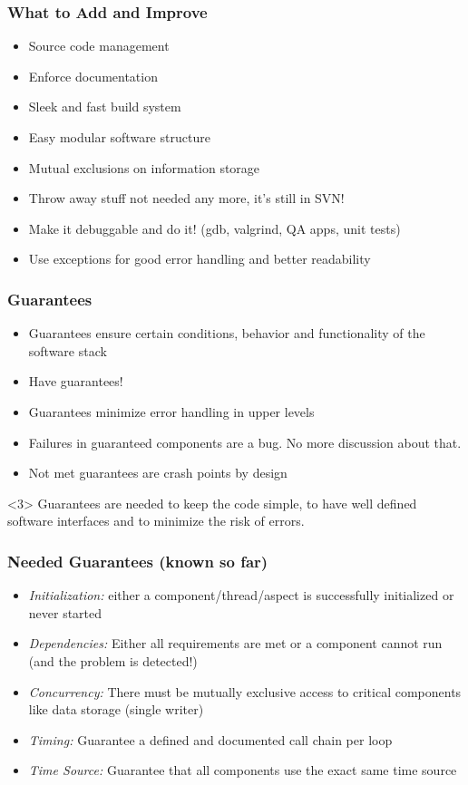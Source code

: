 \begin{frame}
  \frametitle{What to Add and Improve}
  \begin{itemize}
  \item Source code management
  \item Enforce documentation
  \item Sleek and fast build system
  \item Easy modular software structure
  \item Mutual exclusions on information storage
  \item Throw away stuff not needed any more, it's still in SVN!
  \item Make it debuggable and do it! (gdb, valgrind, QA apps, unit tests)
  \item Use exceptions for good error handling and better readability
  \end{itemize}
\end{frame}

\begin{frame}
  \frametitle{Guarantees}
  \begin{itemize}
  \item Guarantees ensure certain conditions, behavior and functionality of
    the software stack
  \item<2-> Have guarantees!
  \item<2-> Guarantees minimize error handling in upper levels
  \item<2-> Failures in guaranteed components are a bug. No more discussion about that.
  \item<2-> Not met guarantees are crash points by design
  \end{itemize}
  \begin{block}<3>{}
    \centering
    Guarantees are needed to keep the code simple, to have well defined
    software interfaces and to minimize the risk of errors.
  \end{block}
\end{frame}

\begin{frame}
  \frametitle{Needed Guarantees (known so far)}
  \begin{itemize}[<+->]
  \item \emph{Initialization:} either a component/thread/aspect is successfully
    initialized or never started
  \item \emph{Dependencies:} Either all requirements are met or a component cannot run
    (and the problem is detected!)
  \item \emph{Concurrency:} There must be mutually exclusive access to critical components
    like data storage (single writer)
  \item \emph{Timing:} Guarantee a defined and documented call chain per loop
  \item \emph{Time Source:} Guarantee that all components use the exact same time source
  \end{itemize}
\end{frame}

